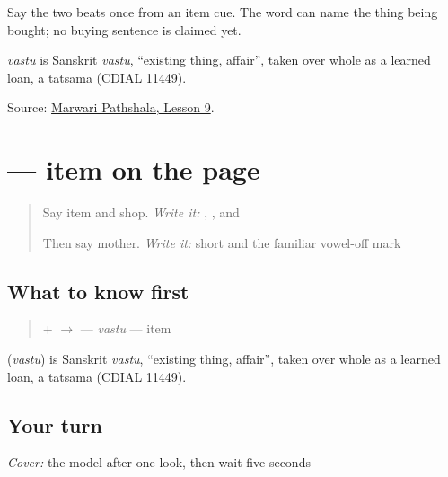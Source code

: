 Say the two beats once from an item cue. The word can name the thing being bought; no buying sentence is claimed yet.

\begin{cousinweb}
\emph{vastu} is Sanskrit \emph{vastu}, \textquotedblleft{}existing thing, affair\textquotedblright{}, taken over whole as a learned loan, a tatsama (CDIAL 11449).
\end{cousinweb}

\begin{tcolorbox}[breakable,colback=teal!4,colframe=teal!35!black,title={Before you move on}]
Source: \href{https://www.marwaripathshala.com/marwari-lesson-9-english}{Marwari Pathshala, Lesson 9}.
\end{tcolorbox}
\section[\texorpdfstring{\mw{वस्तु} (vastu)}{वस्तु (vastu)}]{ — item on the page}

\label{lesson:MW-C13-vastu}



\begin{quote}
Say item and shop. \emph{Write it:} \textbf{}, \textbf{}, and \textbf{}

Then say mother. \emph{Write it:} short \textbf{} and the familiar vowel-off mark \textbf{}
\end{quote}

\subsection*{What to know first}
\begin{quote}
\textbf{} + \textbf{} $\to$ \textbf{} — \emph{vastu} — item
\end{quote}

\begin{cousinweb}
\textbf{} (\emph{vastu}) is Sanskrit \emph{vastu}, \textquotedblleft{}existing thing, affair\textquotedblright{}, taken over whole as a learned loan, a tatsama (CDIAL 11449).
\end{cousinweb}

\subsection*{Your turn}
\emph{Cover:} the model after one look, then wait five seconds

